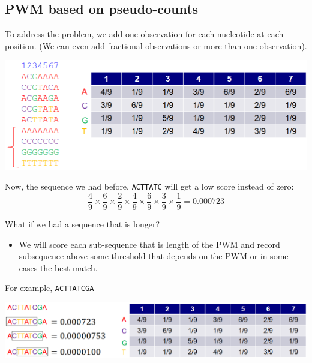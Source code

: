 \documentclass[10pt]{article}
\begin{document}
\subsection*{PWM based on pseudo-counts}
To address the problem, we add one observation for each nucleotide at each position.  (We can even add fractional observations or more than one observation).
\begin{center} 
	\includegraphics*[width=\textwidth]{W7_11.png} 
\end{center}
Now, the sequence we had before, \texttt{ACTTATC} will get a low score instead of zero:
\[\frac{4}{9} \times \frac{6}{9} \times \frac{2}{9} \times \frac{4}{9} \times \frac{6}{9} \times \frac{3}{9} \times \frac{1}{9} = 0.000723\]

What if we had a sequence that is longer?  
\begin{itemize}
	\item We will score each sub-sequence that is length of the PWM and record subsequence above some threshold that depends on the PWM or in some cases the best match.
\end{itemize}
For example, \texttt{ACTTATCGA}
\begin{center} 
	\includegraphics*[width=\textwidth]{W7_12.png} 
\end{center}
\end{document}
